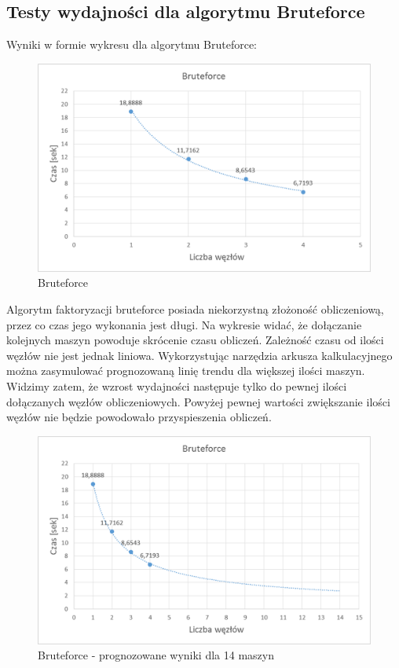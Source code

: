 \documentclass{article}
\begin{document}
\subsection{Testy wydajności dla algorytmu Bruteforce}
Wyniki w formie wykresu dla algorytmu Bruteforce:
\begin{figure}[h!]
    \includegraphics[width=\linewidth]{Bruteforce.png}
    \caption{Bruteforce}
    \label{fig:userpagescr}
\end{figure}
\newpage
Algorytm faktoryzacji bruteforce posiada niekorzystną złożoność obliczeniową, przez co czas jego wykonania jest długi. Na wykresie widać, że dołączanie kolejnych maszyn powoduje skrócenie czasu obliczeń. Zależność czasu od ilości węzłów nie jest jednak liniowa. Wykorzystując narzędzia arkusza kalkulacyjnego można zasymulować prognozowaną linię trendu dla większej ilości maszyn. Widzimy zatem, że wzrost wydajności następuje tylko do pewnej ilości dołączanych węzłów obliczeniowych. Powyżej pewnej wartości zwiększanie ilości węzłów nie będzie powodowało przyspieszenia obliczeń.

\begin{figure}[h!]
    \includegraphics[width=\linewidth]{Bruteforce_prognoza.png}
    \caption{Bruteforce - prognozowane wyniki dla 14 maszyn}
    \label{fig:userpagescr}
\end{figure}
\newpage
\end{document}

